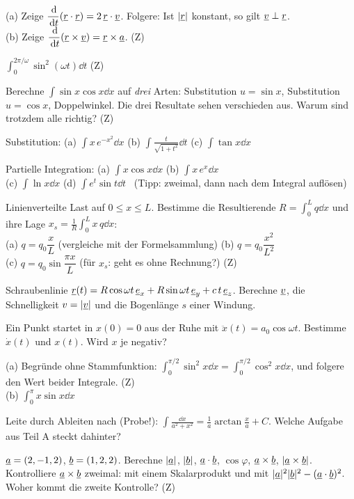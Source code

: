 \documentclass[11pt]{article}
\begin{document}
 (a) Zeige $\dfrac{\,\mathrm{d}}{\,\mathrm{d} t}(\underline{r}\cdot\underline{r})=2\,\underline{r}\cdot\underline{v}$. Folgere: Ist $|\underline{r}|$ konstant, so gilt $\underline{v}\perp\underline{r}$.\\
(b) Zeige $\dfrac{\,\mathrm{d}}{\,\mathrm{d} t}(\underline{r}\times\underline{v})=\underline{r}\times\underline{a}$. \hfill(Z)

 $\displaystyle\int_0^{2\pi/\omega}\sin^2(\omega t)\dd t$ \hfill(Z)

 Berechne $\int\sin x\cos x\dd x$ auf \emph{drei} Arten: Substitution $u=\sin x$, Substitution $u=\cos x$, Doppelwinkel. Die drei Resultate sehen verschieden aus. Warum sind trotzdem alle richtig? \hfill(Z)

 Substitution: (a) $\int x\,e^{-x^2}\dd x$ \quad (b) $\displaystyle\int\frac{t}{\sqrt{1+t^2}}\dd t$ \quad (c) $\int\tan x\dd x$

 Partielle Integration: (a) $\int x\cos x\dd x$ \quad (b) $\int x\,e^x\dd x$\\
(c) $\int\ln x\dd x$ \quad (d) $\int e^t\sin t\dd t$ \ (Tipp: zweimal, dann nach dem Integral auflösen)

 Linienverteilte Last auf $0\le x\le L$. Bestimme die Resultierende $R=\int_0^L q\dd x$ und ihre Lage $x_s=\frac1R\int_0^L x\,q\dd x$:\\
(a) $q=q_0\dfrac{x}{L}$ (vergleiche mit der Formelsammlung) \quad (b) $q=q_0\dfrac{x^2}{L^2}$\\
(c) $q=q_0\sin\dfrac{\pi x}{L}$ (für $x_s$: geht es ohne Rechnung?) \hfill(Z)

 Schraubenlinie $\underline{r}(t)=R\cos\omega t\,\underline{e}_{x}+R\sin\omega t\,\underline{e}_{y}+c\,t\,\underline{e}_{z}$. Berechne $\underline{v}$, die Schnelligkeit $v=|\underline{v}|$ und die Bogenlänge $s$ einer Windung.

 Ein Punkt startet in $x(0)=0$ aus der Ruhe mit $\ddot x(t)=a_0\cos\omega t$. Bestimme $\dot x(t)$ und $x(t)$. Wird $x$ je negativ?

 (a) Begründe ohne Stammfunktion: $\int_0^{\pi/2}\sin^2x\dd x=\int_0^{\pi/2}\cos^2x\dd x$, und folgere den Wert beider Integrale. \hfill(Z)\\
(b) $\int_0^\pi x\sin x\dd x$

 Leite durch Ableiten nach (Probe!): $\displaystyle\int\frac{\dd x}{a^2+x^2}=\frac1a\arctan\frac xa+C$. Welche Aufgabe aus Teil A steckt dahinter?

 $\underline{a}=(2,-1,2)$, $\underline{b}=(1,2,2)$. Berechne $|\underline{a}|$, $|\underline{b}|$, $\underline{a}\cdot\underline{b}$, $\cos\varphi$, $\underline{a}\times\underline{b}$, $|\underline{a}\times\underline{b}|$. Kontrolliere $\underline{a}\times\underline{b}$ zweimal: mit einem Skalarprodukt und mit $|\underline{a}|^2|\underline{b}|^2-(\underline{a}\cdot\underline{b})^2$. Woher kommt die zweite Kontrolle? \hfill(Z)
\end{document}
